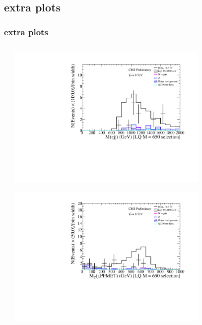 \documentclass[bigger]{beamer}
\begin{document}
\subsection{\enujj extra plots}
\label{sec-1-11}
\begin{frame}
\frametitle{\enujj extra plots}
\label{sec-1-11-1}
\begin{columns} %
\label{sec-1-11-1-1}
\begin{column}{0.475\textwidth}
\label{sec-1-11-1-1-1}
\label{sec-1-11-1-1-2}

\includegraphics[width=0.8\textwidth]{fig/enu/extra/Mejj_LQ650_enujj.pdf}
\label{sec-1-11-1-1-3}

\includegraphics[width=0.8\textwidth]{fig/enu/extra/MTjnu_LQ650_enujj.pdf}
\end{column}
\begin{column}{0.475\textwidth}
\label{sec-1-11-1-1-4}
\label{sec-1-11-1-1-5}


\end{column}
\end{columns}
\end{frame}
\end{document}

